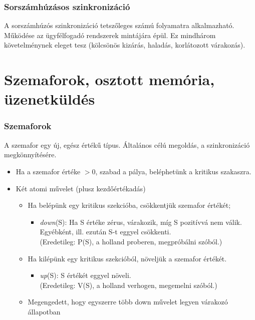\documentclass[tikz,12pt,margin=0px]{article}
\begin{document}
    \subsubsection*{Sorszámhúzásos szinkronizáció}

    \noindent A  sorszámhúzós szinkronizáció tetszőleges számú folyamatra alkalmazható. Működése az ügyfélfogadó rendszerek mintájára épül. Ez mindhárom követelménynek eleget tesz (kölcsönös kizárás, haladás, korlátozott várakozás).

	\section*{Szemaforok, osztott memória, üzenetküldés}
	
    \subsubsection*{Szemaforok}

    A szemafor egy új, egész értékű típus. Általános célú megoldás, a szinkronizáció megkönnyítésére.

    \begin{itemize}[topsep=8pt,itemsep=4pt,partopsep=4pt, parsep=4pt]
        \item Ha a szemafor értéke $> 0$, szabad a pálya, beléphetünk a kritikus szakaszra.
        \item Két atomi művelet (plusz kezdőértékadás)
        \begin{itemize}
            \item Ha belépünk egy kritikus szekcióba, csökkentjük szemafor értékét;
            \begin{itemize}
                \item \emph{down}(S): Ha S értéke zérus, várakozik, míg S pozitívvá nem válik. Egyébként, ill. ezután S-t eggyel csökkenti.\\
                (Eredetileg: P(S), a holland proberen, megpróbálni szóból.)
            \end{itemize}
            \item Ha kilépünk egy kritikus szekcióból, növeljük a szemafor értékét.
            \begin{itemize}
                \item \emph{up}(S): S értékét eggyel növeli. \\
                (Eredetileg: V(S), a holland verhogen, megemelni szóból.)
            \end{itemize}
            \item Megengedett, hogy egyszerre több down művelet legyen várakozó állapotban
        \end{itemize}
    \end{itemize}
\end{document}
